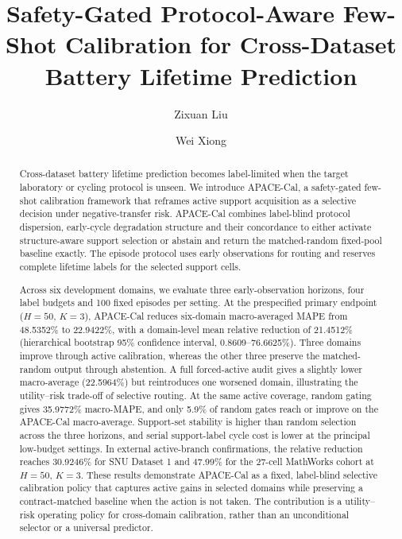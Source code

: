 \documentclass[preprint,12pt]{elsarticle}
\begin{document}
\begin{frontmatter}

\title{Safety-Gated Protocol-Aware Few-Shot Calibration for Cross-Dataset Battery Lifetime Prediction}

\author[inst1]{Zixuan Liu}
\author[inst2]{Wei Xiong}
\address[inst1]{Detroit Green Technology Institute, Hubei University of Technology, Wuhan 430068, China}
\address[inst2]{School of Electrical and Electronic Engineering, Hubei University of Technology, Wuhan 430068, China; Department of Computer Science and Engineering, University of South Carolina, Columbia, SC 29201, USA}

\begin{abstract}
Cross-dataset battery lifetime prediction becomes label-limited when the target laboratory or cycling protocol is unseen. We introduce APACE-Cal, a safety-gated few-shot calibration framework that reframes active support acquisition as a selective decision under negative-transfer risk. APACE-Cal combines label-blind protocol dispersion, early-cycle degradation structure and their concordance to either activate structure-aware support selection or abstain and return the matched-random fixed-pool baseline exactly. The episode protocol uses early observations for routing and reserves complete lifetime labels for the selected support cells.

Across six development domains, we evaluate three early-observation horizons, four label budgets and 100 fixed episodes per setting. At the prespecified primary endpoint ($H=50$, $K=3$), APACE-Cal reduces six-domain macro-averaged MAPE from 48.5352\% to 22.9422\%, with a domain-level mean relative reduction of 21.4512\% (hierarchical bootstrap 95\% confidence interval, 0.8609--76.6625\%). Three domains improve through active calibration, whereas the other three preserve the matched-random output through abstention. A full forced-active audit gives a slightly lower macro-average (22.5964\%) but reintroduces one worsened domain, illustrating the utility--risk trade-off of selective routing. At the same active coverage, random gating gives 35.9772\% macro-MAPE, and only 5.9\% of random gates reach or improve on the APACE-Cal macro-average. Support-set stability is higher than random selection across the three horizons, and serial support-label cycle cost is lower at the principal low-budget settings. In external active-branch confirmations, the relative reduction reaches 30.9246\% for SNU Dataset 1 and 47.99\% for the 27-cell MathWorks cohort at $H=50$, $K=3$. These results demonstrate APACE-Cal as a fixed, label-blind selective calibration policy that captures active gains in selected domains while preserving a contract-matched baseline when the action is not taken. The contribution is a utility--risk operating policy for cross-domain calibration, rather than an unconditional selector or a universal predictor.
\end{abstract}


\end{frontmatter}
\end{document}
